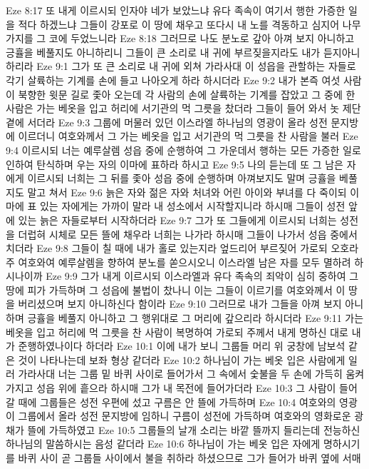 Eze 8:17  또 내게 이르시되 인자야 네가 보았느냐 유다 족속이 여기서 행한 가증한 일을 적다 하겠느냐 그들이 강포로 이 땅에 채우고 또다시 내 노를 격동하고 심지어 나무가지를 그 코에 두었느니라
Eze 8:18  그러므로 나도 분노로 갚아 아껴 보지 아니하고 긍휼을 베풀지도 아니하리니 그들이 큰 소리로 내 귀에 부르짖을지라도 내가 듣지아니하리라
Eze 9:1  그가 또 큰 소리로 내 귀에 외쳐 가라사대 이 성읍을 관할하는 자들로 각기 살륙하는 기계를 손에 들고 나아오게 하라 하시더라
Eze 9:2  내가 본즉 여섯 사람이 북향한 윗문 길로 좇아 오는데 각 사람의 손에 살륙하는 기계를 잡았고 그 중에 한 사람은 가는 베옷을 입고 허리에 서기관의 먹 그릇을 찼더라 그들이 들어 와서 놋 제단 곁에 서더라
Eze 9:3  그룹에 머물러 있던 이스라엘 하나님의 영광이 올라 성전 문지방에 이르더니 여호와께서 그 가는 베옷을 입고 서기관의 먹 그릇을 찬 사람을 불러
Eze 9:4  이르시되 너는 예루살렘 성읍 중에 순행하여 그 가운데서 행하는 모든 가증한 일로 인하여 탄식하며 우는 자의 이마에 표하라 하시고
Eze 9:5  나의 듣는데 또 그 남은 자에게 이르시되 너희는 그 뒤를 좇아 성읍 중에 순행하며 아껴보지도 말며 긍휼을 베풀지도 말고 쳐서
Eze 9:6  늙은 자와 젊은 자와 처녀와 어린 아이와 부녀를 다 죽이되 이마에 표 있는 자에게는 가까이 말라 내 성소에서 시작할지니라 하시매 그들이 성전 앞에 있는 늙은 자들로부터 시작하더라
Eze 9:7  그가 또 그들에게 이르시되 너희는 성전을 더럽혀 시체로 모든 뜰에 채우라 너희는 나가라 하시매 그들이 나가서 성읍 중에서 치더라
Eze 9:8  그들이 칠 때에 내가 홀로 있는지라 엎드리어 부르짖어 가로되 오호라 주 여호와여 예루살렘을 향하여 분노를 쏟으시오니 이스라엘 남은 자를 모두 멸하려 하시나이까
Eze 9:9  그가 내게 이르시되 이스라엘과 유다 족속의 죄악이 심히 중하여 그 땅에 피가 가득하며 그 성읍에 불법이 찼나니 이는 그들이 이르기를 여호와께서 이 땅을 버리셨으며 보지 아니하신다 함이라
Eze 9:10  그러므로 내가 그들을 아껴 보지 아니하며 긍휼을 베풀지 아니하고 그 행위대로 그 머리에 갚으리라 하시더라
Eze 9:11  가는 베옷을 입고 허리에 먹 그릇을 찬 사람이 복명하여 가로되 주께서 내게 명하신 대로 내가 준행하였나이다 하더라
Eze 10:1  이에 내가 보니 그룹들 머리 위 궁창에 남보석 같은 것이 나타나는데 보좌 형상 같더라
Eze 10:2  하나님이 가는 베옷 입은 사람에게 일러 가라사대 너는 그룹 밑 바퀴 사이로 들어가서 그 속에서 숯불을 두 손에 가득히 움켜 가지고 성읍 위에 흩으라 하시매 그가 내 목전에 들어가더라
Eze 10:3  그 사람이 들어갈 때에 그룹들은 성전 우편에 섰고 구름은 안 뜰에 가득하며
Eze 10:4  여호와의 영광이 그룹에서 올라 성전 문지방에 임하니 구름이 성전에 가득하며 여호와의 영화로운 광채가 뜰에 가득하였고
Eze 10:5  그룹들의 날개 소리는 바깥 뜰까지 들리는데 전능하신 하나님의 말씀하시는 음성 같더라
Eze 10:6  하나님이 가는 베옷 입은 자에게 명하시기를 바퀴 사이 곧 그룹들 사이에서 불을 취하라 하셨으므로 그가 들어가 바퀴 옆에 서매
